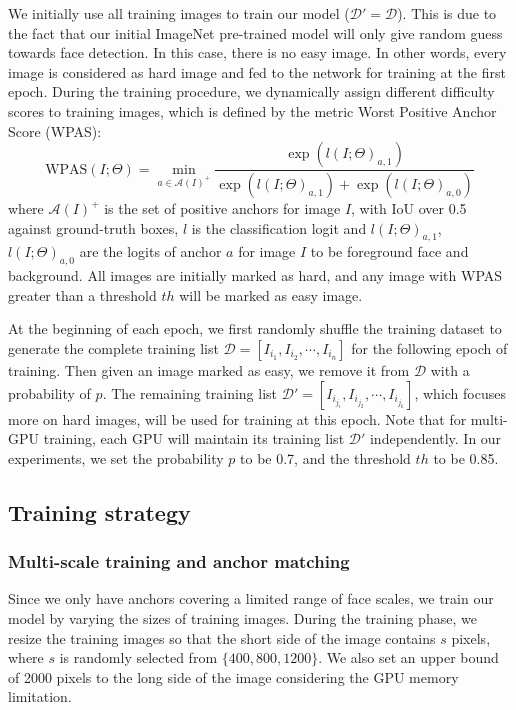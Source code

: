 \documentclass[10pt,twocolumn,letterpaper]{article}
\begin{document}
We initially use all training images to train our model (\ie $\mathcal{D}'=\mathcal{D}$). This is due to the fact that our
initial ImageNet pre-trained model will only give random guess towards face detection. In this case, there is no easy image. In other words, every image is considered as hard image and fed to the network for training at the first epoch.
During the training procedure, we dynamically assign different difficulty scores to training images, which is defined
by the metric Worst Positive Anchor Score (WPAS):
\begin{equation*}
\text{WPAS}(I;\Theta)=\min_{a\in\mathcal{A}(I)^+}
\frac{\exp(l(I;\Theta)_{a,1})}{\exp(l(I;\Theta)_{a,1})+\exp(l(I;\Theta)_{a,0})}
\end{equation*}
where $\mathcal{A}(I)^+$ is the set of positive anchors for image $I$,
with IoU over 0.5 against ground-truth
boxes, $l$ is the classification logit and $l(I;\Theta)_{a,1}$,
$l(I;\Theta)_{a,0}$ are
the logits of anchor $a$ for image $I$ to be foreground face and background.
All images are initially marked as hard, and any image with WPAS greater than a threshold $th$
will be marked as easy image.

At the beginning of each epoch, we first randomly shuffle the training dataset to
generate the complete training list $\mathcal{D}=[I_{i_1},I_{i_2},\cdots,I_{i_n}]$ for the following
epoch of training. Then
given an image marked as easy, we remove it from $\mathcal{D}$ with
a probability of $p$.
The remaining training list $\mathcal{D}'=[I_{i_{j_i}},
I_{i_{j_2}},\cdots,I_{i_{j_k}}]$, which focuses more on hard images,
will be used for training at this epoch. Note that for
multi-GPU training, each GPU will maintain its training list $\mathcal{D}'$ independently.
In our experiments, we set the probability $p$ to be 0.7, and the threshold $th$ to be 0.85.


\subsection{Training strategy}\label{sec:train}
\subsubsection*{Multi-scale training and anchor matching}\label{sec:multiscale}
Since we only have anchors covering a limited range of face scales, we train our model by varying the sizes of training images. During the training phase, we resize
the training images so that the short side of the image contains $s$ pixels, where $s$ is
randomly selected from $\{400,800,1200\}$. We also set an upper bound of 2000 pixels to the long side of the image considering the GPU memory limitation.
\end{document}
